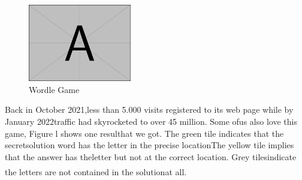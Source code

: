 \documentclass[12pt]{ctexart}
\newcommand{\upcite}[1]{\textsuperscript{\textsuperscript{\cite{#1}}}}%
\begin{document}







\begin{figure}
	\vspace{-15pt}
	\includegraphics*[width=0.4\textwidth]{example-image-a.pdf}
	\vspace{0pt}
	\caption{Wordle Game}
	\vspace{-20pt}
\end{figure}
Back in October 2021,less than 5.000 visits registered to its web page while by January 2022traffic had skyrocketed to over 45 million. Some ofus also love this game, Figure l shows one resulthat we got. The green tile indicates that the secretsolution word has the letter in the precise locationThe yellow tile implies that the answer has theletter but not at the correct location. Grey tilesindicate the letters are not contained in the solutionat all\upcite{3}.
\end{document}
